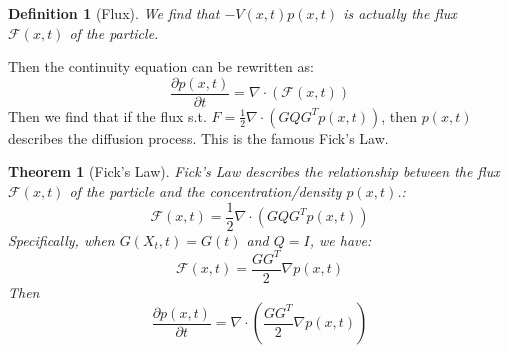 \documentclass{article}
\newtheorem{theorem}{Theorem}
\newtheorem{definition}{Definition}
\begin{document}
\begin{definition}[Flux]
    We find that $-V(x, t)p(x, t)$ is actually the flux $\mathcal{F}(x, t)$ of the particle.
\end{definition}
Then the continuity equation can be rewritten as:
\begin{equation}
    \frac{\partial p(x, t)}{\partial t} = \nabla\cdot\left(\mathcal{F}(x, t)\right)
\end{equation}
Then we find that if the flux s.t. $F = \frac{1}{2}\nabla\cdot\left(GQG^Tp(x, t)\right)$, then $p(x, t)$ describes the diffusion process. This is the famous Fick's Law.
\begin{theorem}[Fick's Law]
    Fick's Law describes the relationship between the flux $\mathcal{F}(x, t)$ of the particle and the concentration/density $p(x, t)$.:
    \begin{equation}
        \mathcal{F}(x, t) = \frac{1}{2}\nabla\cdot\left(GQG^Tp(x, t)\right)
    \end{equation}
    Specifically, when $G(X_t, t)=G(t)$ and $Q=I$, we have:
    \begin{equation}
        \mathcal{F}(x, t) = \frac{GG^T}{2}\nabla p(x, t)
    \end{equation}
    Then 
    \begin{equation}
        \frac{\partial p(x, t)}{\partial t} = \nabla \cdot\left(\frac{GG^T}{2}\nabla p(x, t)\right)
    \end{equation}
\end{theorem}
\end{document}
